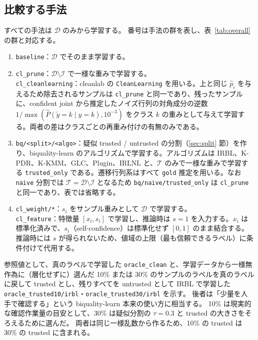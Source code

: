 \documentclass[a4paper,10pt]{ltjsarticle}
\newcommand{\method}[1]{\texttt{#1}}
\newcommand{\cl}{\textsf{cleanlab}}
\newcommand{\bq}{\textsf{biquality-learn}}
\begin{document}
\subsection{比較する手法}
すべての手法は $\mathcal{D}$ のみから学習する。
番号は手法の群を表し、表~\ref{tab:overall} の群と対応する。
\begin{enumerate}[label=(\arabic*)]
  \item \method{baseline}：$\mathcal{D}$ でそのまま学習する。
  \item \method{cl\_prune}：$\mathcal{D} \setminus \mathcal{I}$ で一様な重みで学習する。\\
        \method{cl\_cleanlearning}：\cl{} の \texttt{CleanLearning} を用いる。上と同じ $\hat{p}_i$ を与えるため除去されるサンプルは \method{cl\_prune} と同一であり、残ったサンプルに、confident joint から推定したノイズ行列の対角成分の逆数 $1/\max(\hat{P}(\tilde{y}=k \mid y=k), 10^{-3})$ をクラス $k$ の重みとして与えて学習する。両者の差はクラスごとの再重み付けの有無のみである。
  \item \method{bq/<split>/<algo>}：疑似 trusted / untrusted の分割（\ref{sec:split} 節）を作り、\bq{} のアルゴリズムで学習する。アルゴリズムは IRBL、K-PDR、K-KMM、GLC、Plugin、IRLNL と、$\mathcal{T}$ のみで一様な重みで学習する \method{trusted\_only} である。遷移行列系はすべて \texttt{gold} 推定を用いる。なお \method{naive} 分割では $\mathcal{T} = \mathcal{D} \setminus \mathcal{I}$ となるため \method{bq/naive/trusted\_only} は \method{cl\_prune} と同一であり、表では省略する。
  \item \method{cl\_weight/*}：$s_i$ をサンプル重みとして $\mathcal{D}$ で学習する。\\
        \method{cl\_feature}：特徴量 $[x_i, s_i]$ で学習し、推論時は $s=1$ を入力する。$x_i$ は標準化済みで、$s_i$（self-confidence）は標準化せず $[0,1]$ のまま結合する。推論時には $s$ が得られないため、値域の上限（最も信頼できるラベル）に条件付けて代用する。
\end{enumerate}
参照値として、真のラベルで学習した \method{oracle\_clean} と、学習データから一様無作為に（層化せずに）選んだ 10\% または 30\% のサンプルのラベルを真のラベルに戻して trusted とし、残りすべてを untrusted として IRBL で学習した \method{oracle\_trusted10/irbl}・\method{oracle\_trusted30/irbl} を示す。
後者は「少量を人手で確認する」という \bq{} 本来の使い方に相当する。
10\% は現実的な確認作業量の目安として、30\% は疑似分割の $\tau = 0.3$ と trusted の大きさをそろえるために選んだ。
両者は同じ一様乱数から作るため、10\% の trusted は 30\% の trusted に含まれる。
\end{document}
